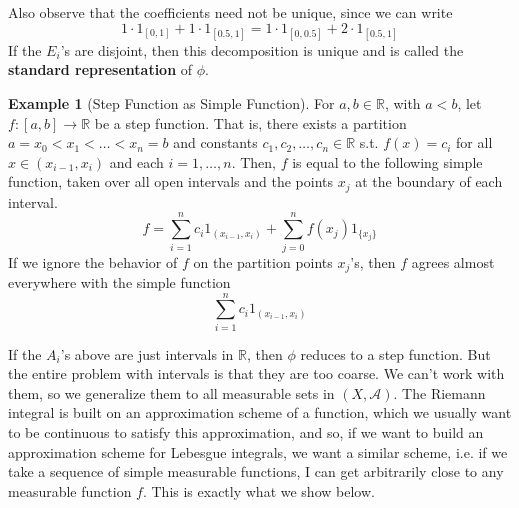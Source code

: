 \documentclass{article}
\theoremstyle{definition}
\newtheorem{example}{Example}[section]
\theoremstyle{remark}
\theoremstyle{definition}
\begin{document}
Also observe that the coefficients need not be unique, since we can write 
\[1 \cdot 1_{[0, 1]} + 1 \cdot 1_{[0.5, 1]} = 1 \cdot 1_{[0, 0.5]} + 2 \cdot 1_{[0.5, 1]}\]
If the $E_i$'s are disjoint, then this decomposition is unique and is called the \textbf{standard representation} of $\phi$. 

\begin{example}[Step Function as Simple Function]
For $a, b \in \mathbb{R}$, with $a < b$, let $f: [a, b] \longrightarrow \mathbb{R}$ be a step function. That is, there exists a partition $a = x_0 < x_1 < \ldots < x_n = b$ and constants $c_1, c_2, \ldots, c_n \in \mathbb{R}$ s.t. $f(x) = c_i$ for all $x \in (x_{i-1}, x_i)$ and each $i = 1, \ldots, n$. Then, $f$ is equal to the following simple function, taken over all open intervals and the points $x_j$ at the boundary of each interval. 
\[f = \sum_{i=1}^n c_i 1_{(x_{i-1}, x_i)} + \sum_{j=0}^n f(x_j) 1_{\{x_j\}}\]
If we ignore the behavior of $f$ on the partition points $x_j$'s, then $f$ agrees almost everywhere with the simple function 
\[\sum_{i=1}^n c_i 1_{(x_{i-1}, x_i)}\]
\end{example}

If the $A_i$'s above are just intervals in $\mathbb{R}$, then $\phi$ reduces to a step function. But the entire problem with intervals is that they are too coarse. We can't work with them, so we generalize them to all measurable sets in $(X, \mathcal{A})$. The Riemann integral is built on an approximation scheme of a function, which we usually want to be continuous to satisfy this approximation, and so, if we want to build an approximation scheme for Lebesgue integrals, we want a similar scheme, i.e. if we take a sequence of simple measurable functions, I can get arbitrarily close to any measurable function $f$. This is exactly what we show below. 
\end{document}

